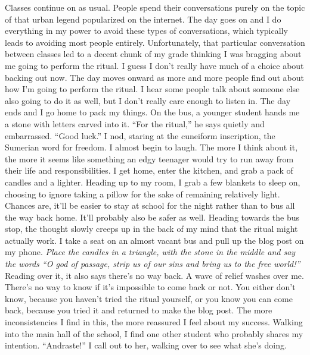 \documentclass[a4paper, 12pt]{book}
\newcommand\tab[1][1cm]{\hspace*{#1}}
\begin{document}
\newline
\tab
Classes continue on as usual. People spend their conversations purely on the topic of that urban legend popularized on the internet. The day goes on and I do everything in my power to avoid these types of conversations, which typically leads to avoiding most people entirely. Unfortunately, that particular conversation between classes led to a decent chunk of my grade thinking I was bragging about me going to perform the ritual. I guess I don’t really have much of a choice about backing out now.
\newline
\tab
The day moves onward as more and more people find out about how I’m going to perform the ritual. I hear some people talk about someone else also going to do it as well, but I don’t really care enough to listen in. The day ends and I go home to pack my things. On the bus, a younger student hands me a stone with letters carved into it. “For the ritual,” he says quietly and embarrassed. “Good luck.” I nod, staring at the cuneiform inscription, \textcuneiform{\AmaGi} the Sumerian word for freedom. I almost begin to laugh. The more I think about it, the more it seems like something an edgy teenager would try to run away from their life and responsibilities.
\newline
\tab
I get home, enter the kitchen, and grab a pack of candles and a lighter. Heading up to my room, I grab a few blankets to sleep on, choosing to ignore taking a pillow for the sake of remaining relatively light. Chances are, it’ll be easier to stay at school for the night rather than to bus all the way back home. It’ll probably also be safer as well. Heading towards the bus stop, the thought slowly creeps up in the back of my mind that the ritual might actually work. I take a seat on an almost vacant bus and pull up the blog post on my phone. 
\newline
\tab
\textit{
Place the candles in a triangle, with the stone in the middle and say the words “O god of passage, strip us of our sins and bring us to the free world!” 
}
\newline
\tab
Reading over it, it also says there’s no way back. A wave of relief washes over me. There’s no way to know if it’s impossible to come back or not. You either don’t know, because you haven’t tried the ritual yourself, or you know you can come back, because you tried it and returned to make the blog post. The more inconsistencies I find in this, the more reassured I feel about my success.
\newline
\tab
Walking into the main hall of the school, I find one other student who probably shares my intention. “Andraste!” I call out to her, walking over to see what she’s doing.
\end{document}
